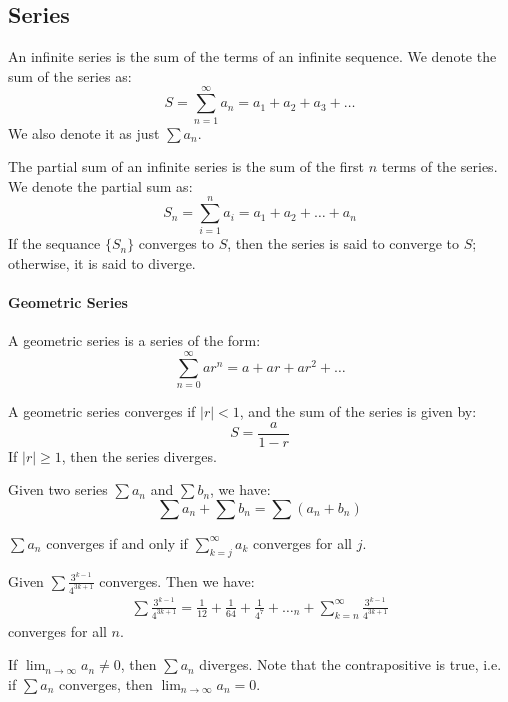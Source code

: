 \documentclass[11pt]{article}
\begin{document}
\subsection{Series}
\begin{definition}
    An infinite series is the sum of the terms of an infinite sequence. We denote the sum of the series as:
    \begin{equation}
        S = \sum_{n=1}^{\infty} a_n = a_1 + a_2 + a_3 + \ldots
    \end{equation}
    We also denote it as just $\sum a_n$.
\end{definition}
\begin{definition}
    The partial sum of an infinite series is the sum of the first $n$ terms of the series. We denote the partial sum as:
    \begin{equation}
        S_n = \sum_{i=1}^{n} a_i = a_1 + a_2 + \ldots + a_n
    \end{equation}
    If the sequance $\{S_n\}$ converges to $S$, then the series is said to converge to $S$; otherwise, it is said to diverge.
\end{definition}
\paragraph{Geometric Series} A geometric series is a series of the form:
\begin{equation}
    \sum_{n=0}^{\infty} ar^n = a + ar + ar^2 + \ldots
\end{equation}
\begin{theorem}
    A geometric series converges if $|r| < 1$, and the sum of the series is given by:
    \begin{equation}
        S = \frac{a}{1 - r}
    \end{equation}
    If $|r| \ge 1$, then the series diverges.
\end{theorem}
\begin{theorem}
    Given two series $\sum a_n$ and $\sum b_n$, we have:
    \begin{equation}
        \sum a_n + \sum b_n = \sum (a_n + b_n)
    \end{equation}
\end{theorem}
\begin{theorem}[Convergence]
    $\sum a_n$ converges if and only if $\sum_{k=j}^{\infty} a_k$ converges for all $j$.
\end{theorem}
\begin{example}
    Given $\sum \frac{3^{k-1}}{4^{3k+1}}$ converges. Then we have:
    \begin{align*}
        \sum \frac{3^{k-1}}{4^{3k+1}} = \frac{1}{12} + \frac{1}{64} + \frac{1}{4^7} + \ldots_n + \sum^{\infty}_{k=n} \frac{3^{k-1}}{4^{3k+1}}
    \end{align*}
    converges for all $n$.
\end{example}
\begin{theorem}
    If $\lim_{n \to \infty} a_n \ne 0$, then $\sum a_n$ diverges. Note that the contrapositive is true, i.e. if $\sum a_n$ converges, then $\lim_{n \to \infty} a_n = 0$.
\end{theorem}
\end{document}
